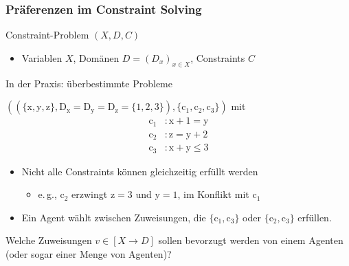 \documentclass[handout,10pt,xcolor={dvipsnames},fleqn]{beamer}
\newcommand{\cemph}[1]{\alert{#1}}
\begin{document}
\begin{frame}
\frametitle{Präferenzen im Constraint Solving}

Constraint-Problem $(X, D, C)$ 
\begin{itemize}
  \item \cemph{Variablen} $X$,
\cemph{Domänen} $D = (D_x)_{x \in X}$,
\cemph{Constraints} $C$
\end{itemize}

\vspace*{1ex}

In der Praxis: \cemph{überbestimmte} Probleme

\vspace*{2ex}

$((\{ \mathrm{x}, \mathrm{y}, \mathrm{z} \},
\mathrm{D}_{\mathrm{x}} = \mathrm{D}_{\mathrm{y}} =
\mathrm{D}_{\mathrm{z}} = \{ 1, 2, 3 \}), \{ \mathrm{c}_1,
\mathrm{c}_2, \mathrm{c}_3 \})$ mit 
\bgroup{}
\begin{align*}
  \mathrm{c}_1 &: \mathrm{x} + 1 = \mathrm{y}
\\[-.4ex]
  \mathrm{c}_2 &: \mathrm{z} = \mathrm{y} + 2
\\[-.4ex]
  \mathrm{c}_3 &: \mathrm{x} + \mathrm{y} \leq 3
\end{align*}
\egroup

\begin{itemize}
  \item Nicht alle Constraints können gleichzeitig erfüllt werden
\begin{itemize} \pause
  \item e.\,g., $\mathrm{c}_2$ erzwingt $\mathrm{z} = 3$ und $\mathrm{y} = 1$, im Konflikt mit $\mathrm{c}_1$
\end{itemize}

  \item Ein Agent \cemph{wählt} zwischen Zuweisungen, die $\{ \mathrm{c}_1, \mathrm{c}_3 \}$ oder $\{ \mathrm{c}_2, \mathrm{c}_3 \}$ erfüllen.
\end{itemize}

\vspace*{2ex}

Welche Zuweisungen $v \in [X \to D]$ sollen \alert{bevorzugt} werden von einem Agenten (oder sogar einer Menge von Agenten)?

\end{frame}
\end{document}

